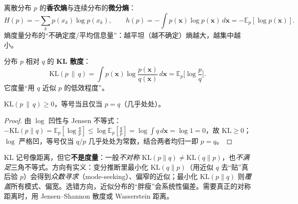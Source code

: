 \begin{definition}[（微分）熵]\label{def:entropy}
离散分布 $p$ 的\textbf{香农熵}与连续分布的\textbf{微分熵}：
\begin{equation}
  H(p)=-\sum_k p(x_k)\log p(x_k),
  \qquad
  h(p)=-\int p(\mathbf{x})\log p(\mathbf{x})\,d\mathbf{x}=-\mathbb{E}_p[\log p(\mathbf{x})].
  \label{eq:entropy}
\end{equation}
熵度量分布的“不确定度/平均信息量”：越平坦（越不确定）熵越大，越集中越小。
\end{definition}

\begin{definition}[KL 散度（相对熵）]\label{def:kl}
分布 $p$ 相对 $q$ 的 \textbf{KL 散度}：
\begin{equation}
  \mathrm{KL}(p\,\|\,q)=\int p(\mathbf{x})\log\frac{p(\mathbf{x})}{q(\mathbf{x})}\,d\mathbf{x}=\mathbb{E}_p\!\Big[\log\frac{p}{q}\Big].
  \label{eq:kl}
\end{equation}
它度量“用 $q$ 近似 $p$ 的低效程度”。
\end{definition}

\begin{theorem}\label{thm:kl-nonneg}
$\mathrm{KL}(p\,\|\,q)\ge0$，等号当且仅当 $p=q$（几乎处处）。
\end{theorem}
\begin{proof}
由 $\log$ 凹性与 Jensen 不等式：$-\mathrm{KL}(p\|q)=\mathbb{E}_p[\log\frac{q}{p}]\le\log\mathbb{E}_p[\frac{q}{p}]=\log\int q\,d\mathbf{x}=\log1=0$，故 $\mathrm{KL}\ge0$；$\log$ 严格凹，等号仅当 $q/p$ 几乎处处为常数，结合两者均归一即 $p=q$。
\end{proof}

\begin{pitfall}
KL 记号像距离，但它\textbf{不是度量}：一般\emph{不对称} $\mathrm{KL}(p\|q)\ne\mathrm{KL}(q\|p)$，也\emph{不满足}三角不等式。方向有实义：变分推断里最小化 $\mathrm{KL}(q\|p)$（用近似 $q$ 去“贴”真后验 $p$）会得到\emph{众数寻求}（mode-seeking）、偏窄的近似；最小化 $\mathrm{KL}(p\|q)$ 则\emph{覆盖}所有模式、偏宽。选错方向，近似分布的“胖瘦”会系统性偏差。需要真正的对称距离时，用 Jensen--Shannon 散度或 Wasserstein 距离。
\end{pitfall}

